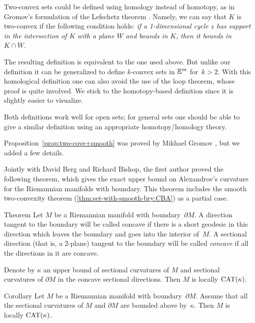 Two-convex sets could be defined using homology instead of homotopy, as in Gromov's formulation of the Lefschetz theorem \cite[\S\textonehalf]{gromov-1991}.
Namely, we can say that $K$ is two-convex if the following condition holds: \textit{if a 1-dimensional cycle $z$ has support in the intersection of $K$ with a plane $W$ and bounds in $K$, then it bounds in $K\cap W$}.

The resulting definition is equivalent to the one used above.
But unlike our definition it can be generalized to define $k$-convex sets in $\mathbb{E}^m$ for~$k>2$.
With this homological definition one can also avoid the use of the loop theorem, whose proof is quite involved.
We stick to the homotopy-based definition since it is slightly easier to visualize.

Both definitions work well for open sets; for general sets one should be able to give a similar definition using  an appropriate homotopy/ho\-mo\-logy theory.

Proposition~\ref{prop:two-cove+smooth} was proved by Mikhael Gromov \cite[\S\textonehalf]{gromov-1991}, but we added a few details.

Jointly with David Berg and Richard Bishop, the first author proved the following theorem, which gives the exact upper bound on Alexandrov's curvature for the Riemannian manifolds with boundary.
This theorem includes the smooth two-convexity theorem (\ref{thm:set-with-smooth-bry:CBA}) as a partial case.

\begin{thm}{Theorem}
Let $M$ be a Riemannian manifold with boundary~$\partial M$.
A direction tangent to the boundary will be called concave if there is a short geodesic in this direction which leaves the boundary and goes into the interior of~$M$.
A sectional direction (that is, a 2-plane) 
tangent to the boundary 
will be called {}\emph{concave} if all the directions in it are concave.

Denote by $\kappa$ an upper bound of sectional curvatures of $M$ and  
sectional curvatures of $\partial M$ in the concave sectional directions. 
Then $M$ is locally $\mathrm{CAT}(\kappa)$. 
\end{thm}

\begin{thm}{Corollary}
Let $M$ be a Riemannian manifold with boundary~$\partial M$. 
Assume that all the sectional curvatures of $M$ and $\partial M$ are bounded above by~$\kappa$.
Then $M$ is locally $\mathrm{CAT}(\kappa)$.
\end{thm}

